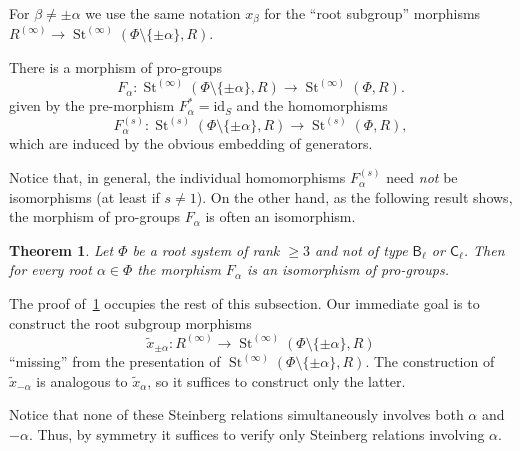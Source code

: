 \documentclass{article}
\numberwithin{equation}{section}
\newtheorem{theorem}{Theorem}
\theoremstyle{definition}
\theoremstyle{remark}
\DeclareMathOperator\St{St}
\DeclareMathOperator{\Pro}{Pro}
\newcommand{\Set}{\mathbf{Set}}
\newcommand{\rB}{\mathsf{B}}
\newcommand{\rC}{\mathsf{C}}
\begin{document}
For $\beta \neq \pm\alpha$ we use the same notation $x_\beta$ for the ``root subgroup'' morphisms $R^{(\infty)}\to \St^{(\infty)}(\Phi \setminus\{\pm\alpha\}, R)$.

There is a morphism of pro-groups
\[ F_\alpha \colon \St^{(\infty)}(\Phi \setminus\{\pm\alpha\}, R) \to \St^{(\infty)}(\Phi, R). \]
given by the pre-morphism $F_\alpha^{*} = \mathrm{id}_S$ and the homomorphisms \[F_\alpha^{(s)} \colon \St^{(s)}(\Phi \setminus\{\pm\alpha\}, R) \to \St^{(s)}(\Phi, R),\] which are induced by the obvious embedding of generators.

Notice that, in general, the individual homomorphisms $F_\alpha^{(s)}$ need {\it not} be isomorphisms (at least if $s \neq 1$). On the other hand, as the following result shows, the morphism of pro-groups $F_\alpha$ is often an isomorphism. 
\begin{theorem}\label{SingleRootElimination}
 Let \(\Phi\) be a root system of rank \(\geq 3\) and not of type \(\rB_\ell\) or \(\rC_\ell\). Then for every root \(\alpha \in \Phi\) the morphism $F_\alpha$ is an isomorphism of pro-groups.
\end{theorem}
The proof of~\cref{SingleRootElimination} occupies the rest of this subsection.
Our immediate goal is to construct the root subgroup morphisms
\[\widetilde x_{\pm \alpha} \colon R^{(\infty)} \to \St^{(\infty)}(\Phi \setminus \{\pm \alpha\}, R) \] ``missing'' from the presentation of $\St^{(\infty)}(\Phi\setminus\{\pm\alpha\}, R)$. The construction of $\widetilde{x}_{-\alpha}$ is analogous to $\widetilde{x}_\alpha$, so it suffices to construct only the latter.

Notice that none of these Steinberg relations simultaneously involves both \(\alpha\) and \(-\alpha\).
Thus, by symmetry it suffices to verify only Steinberg relations involving \(\alpha\).

\end{document}
